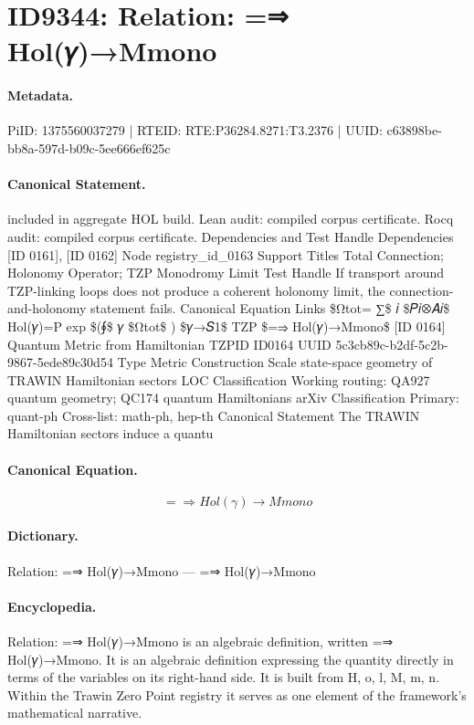 \section*{ID9344: Relation: =⇒ Hol(𝛾)→Mmono}
\paragraph{Metadata.}
PiID: 1375560037279 | RTEID: RTE:P36284.8271:T3.2376 | UUID: c63898be-bb8a-597d-b09c-5ee666ef625c

\paragraph{Canonical Statement.}
included in aggregate HOL build. Lean audit: compiled corpus certificate. Rocq audit: compiled corpus certificate. Dependencies and Test Handle Dependencies [ID 0161], [ID 0162] Node registry\_id\_0163 Support Titles Total Connection; Holonomy Operator; TZP Monodromy Limit Test Handle If transport around TZP-linking loops does not produce a coherent holonomy limit, the connection-and-holonomy statement fails. Canonical Equation Links \$Ωtot= ∑\$ 𝑖 \$𝑃𝑖⊗𝐴𝑖\$ Hol(𝛾)=P exp \$(∮\$ 𝛾 \$Ωtot\$ ) \$𝛾→𝑆1\$ TZP \$=⇒ Hol(𝛾)→Mmono\$ [ID 0164] Quantum Metric from Hamiltonian TZPID ID0164 UUID 5c3cb89c-b2df-5c2b-9867-5ede89c30d54 Type Metric Construction Scale state-space geometry of TRAWIN Hamiltonian sectors LOC Classification Working routing: QA927 quantum geometry; QC174 quantum Hamiltonians arXiv Classification Primary: quant-ph Cross-list: math-ph, hep-th Canonical Statement The TRAWIN Hamiltonian sectors induce a quantu

\paragraph{Canonical Equation.}
\[
=⇒ Hol(𝛾)→Mmono
\]

\paragraph{Dictionary.}
Relation: =⇒ Hol(𝛾)→Mmono — =⇒ Hol(𝛾)→Mmono

\paragraph{Encyclopedia.}
Relation: =⇒ Hol(𝛾)→Mmono is an algebraic definition, written =⇒ Hol(𝛾)→Mmono. It is an algebraic definition expressing the quantity directly in terms of the variables on its right-hand side. It is built from H, o, l, M, m, n. Within the Trawin Zero Point registry it serves as one element of the framework's mathematical narrative.

